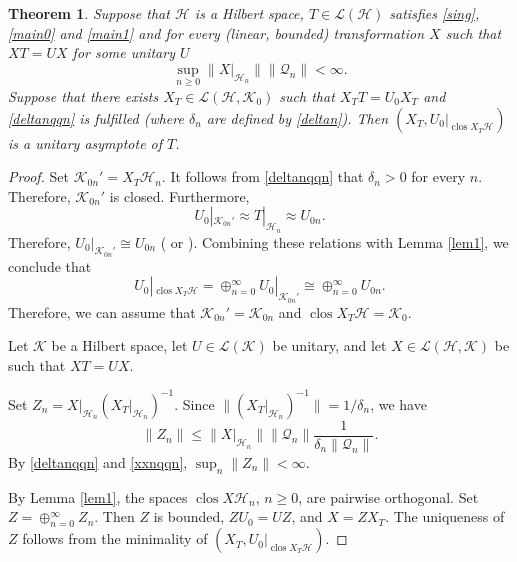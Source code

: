 \documentclass[a4paper,oneside,11pt]{amsart}
\numberwithin{equation}{section}
\theoremstyle{plain}
\newtheorem{theorem}{Theorem}[section]
\theoremstyle{definition}
\begin{document}
\begin{theorem}\label{thm3}  Suppose that $\mathcal H$ is a Hilbert space,  
  $T\in  \mathcal L(\mathcal H)$ satisfies  \eqref{sing}, \eqref{main0} and \eqref{main1} 
 and for every (linear, bounded) transformation $X$ such that $XT=UX$ for some unitary $U$ 
\begin{equation} \label{xxnqqn} \sup_{n\geq 0}\|X|_{\mathcal H_n}\| \|\mathcal Q_n\|<\infty.\end{equation}
Suppose that there exists $X_T\in\mathcal L(\mathcal H,\mathcal K_0)$ such that $X_T T=U_0 X_T$ 
and \eqref{deltanqqn} is fulfilled (where $\delta_n$ are defined by \eqref{deltan}). 
Then 
$(X_T, U_0|_{\operatorname{clos}X_T\mathcal H})$ is a unitary asymptote of $T$.
\end{theorem}

\begin{proof}  Set $\mathcal K_{0n}'=X_T\mathcal H_n$. It follows from \eqref{deltanqqn} that $\delta_n>0$ for every $n$. Therefore, 
$\mathcal K_{0n}'$ is  closed. Furthermore, $$U_0|_{\mathcal K_{0n}'}\approx T|_{\mathcal H_n} \approx U_{0n}.$$ 
Therefore, $U_0|_{\mathcal K_{0n}'}\cong U_{0n}$ ({\cite[Proposition II.3.4]{nfbk}} or 
{\cite[Proposition II.10.6]{conway}}). Combining these relations with Lemma \ref{lem1}, 
we conclude that 
$$U_0|_{\operatorname{clos}X_T\mathcal H}=\oplus_{n=0}^\infty U_0|_{\mathcal K_{0n}'}\cong\oplus_{n=0}^\infty U_{0n}.$$
Therefore, we can assume that  $\mathcal K_{0n}'= \mathcal K_{0n}$ and 
$\operatorname{clos}X_T\mathcal H=\mathcal K_0$.

Let $\mathcal K$ be a Hilbert space, let  $U\in\mathcal L(\mathcal K)$ be unitary, and let 
$X\in\mathcal L(\mathcal H,\mathcal K)$ be  such that $XT=UX$. 

Set $Z_n=X|_{\mathcal H_n}(X_T|_{\mathcal H_n})^{-1}$. Since $\|(X_T|_{\mathcal H_n})^{-1}\|=1/\delta_n$, we have 
$$\|Z_n\|\leq\|X|_{\mathcal H_n}\|\|\mathcal Q_n\|\frac{1}{\delta_n\|\mathcal Q_n\|}.$$
By \eqref{deltanqqn} and \eqref{xxnqqn}, $\sup_n\|Z_n\|<\infty$. 

 By Lemma \ref{lem1},  the spaces $\operatorname{clos}X\mathcal H_n$, $n\geq 0$, are pairwise orthogonal.  
Set $Z=\oplus_{n=0}^\infty Z_n$. Then $Z$ is bounded, $ZU_0=UZ$, and $X=ZX_T$.  The uniqueness of $Z$ follows from the minimality of $(X_T, U_0|_{\operatorname{clos}X_T\mathcal H})$. 
\end{proof}
\end{document}
